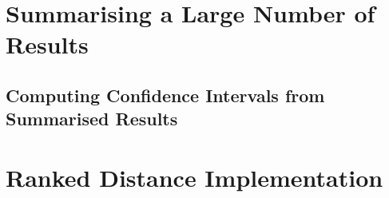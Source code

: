 \section{Summarising a Large Number of Results}
\label{sec:summarise-script}
\lstset{language=bash}


\subsection{Computing Confidence Intervals from Summarised Results}
\lstset{language=Python}


\section{Ranked Distance Implementation}
\label{sec:rankeddist-code}
\lstset{language=Java}

